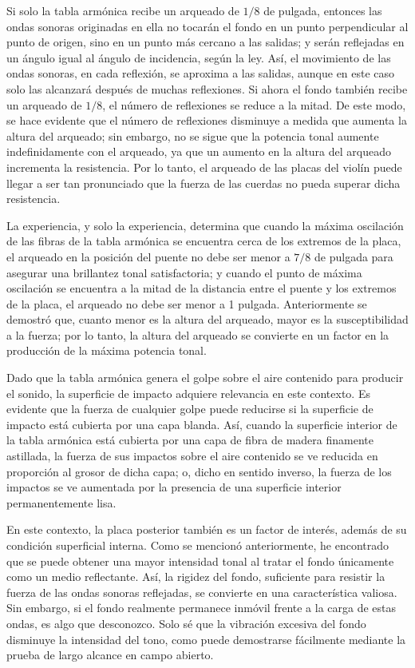 \documentclass[12pt]{book}
\begin{document}
Si solo la tabla armónica recibe un arqueado de $1/8$ de pulgada, entonces las ondas sonoras originadas en ella no tocarán el fondo en un punto perpendicular al punto de origen, sino en un punto más cercano a las salidas; y serán reflejadas en un ángulo igual al ángulo de incidencia, según la ley. Así, el movimiento de las ondas sonoras, en cada reflexión, se aproxima a las salidas, aunque en este caso solo las alcanzará después de muchas reflexiones. Si ahora el fondo también recibe un arqueado de $1/8$, el número de reflexiones se reduce a la mitad. De este modo, se hace evidente que el número de reflexiones disminuye a medida que aumenta la altura del arqueado; sin embargo, no se sigue que la potencia tonal aumente indefinidamente con el arqueado, ya que un aumento en la altura del arqueado incrementa la resistencia. Por lo tanto, el arqueado de las placas del violín puede llegar a ser tan pronunciado que la fuerza de las cuerdas no pueda superar dicha resistencia.

La experiencia, y solo la experiencia, determina que cuando la máxima oscilación de las fibras de la tabla armónica se encuentra cerca de los extremos de la placa, el arqueado en la posición del puente no debe ser menor a $7/8$ de pulgada para asegurar una brillantez tonal satisfactoria; y cuando el punto de máxima oscilación se encuentra a la mitad de la distancia entre el puente y los extremos de la placa, el arqueado no debe ser menor a 1 pulgada. Anteriormente se demostró que, cuanto menor es la altura del arqueado, mayor es la susceptibilidad a la fuerza; por lo tanto, la altura del arqueado se convierte en un factor en la producción de la máxima potencia tonal.

Dado que la tabla armónica genera el golpe sobre el aire contenido para producir el sonido, la superficie de impacto adquiere relevancia en este contexto. Es evidente que la fuerza de cualquier golpe puede reducirse si la superficie de impacto está cubierta por una capa blanda. Así, cuando la superficie interior de la tabla armónica está cubierta por una capa de fibra de madera finamente astillada, la fuerza de sus impactos sobre el aire contenido se ve reducida en proporción al grosor de dicha capa; o, dicho en sentido inverso, la fuerza de los impactos se ve aumentada por la presencia de una superficie interior permanentemente lisa. 

En este contexto, la placa posterior también es un factor de interés, además de su condición superficial interna. Como se mencionó anteriormente, he encontrado que se puede obtener una mayor intensidad tonal al tratar el fondo únicamente como un medio reflectante. Así, la rigidez del fondo, suficiente para resistir la fuerza de las ondas sonoras reflejadas, se convierte en una característica valiosa. Sin embargo, si el fondo realmente permanece inmóvil frente a la carga de estas ondas, es algo que desconozco. Solo sé que la vibración excesiva del fondo disminuye la intensidad del tono, como puede demostrarse fácilmente mediante la prueba de largo alcance en campo abierto.
\end{document}
